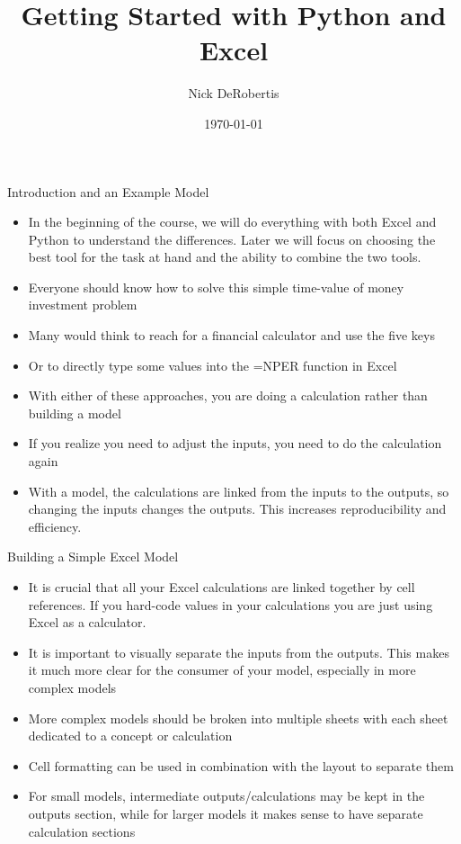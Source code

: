 \documentclass[]{article}
\begin{document}
\title{Getting Started with Python and Excel}
\author{Nick DeRobertis}
\date{\today}
\maketitle
\begin{section}{Introduction and an Example Model}
\begin{itemize}
\item In the beginning of the course, we will do everything with both Excel and Python to understand the differences. Later we will focus on choosing the best tool for the task at hand and the ability to combine the two tools.
\item Everyone should know how to solve this simple time-value of money investment problem
\item Many would think to reach for a financial calculator and use the five keys
\item Or to directly type some values into the =NPER function in Excel
\item With either of these approaches, you are doing a calculation rather than building a model
\item If you realize you need to adjust the inputs, you need to do the calculation again
\item With a model, the calculations are linked from the inputs to the outputs, so changing the inputs changes the outputs. This increases reproducibility and efficiency.
\end{itemize}
\end{section}
\begin{section}{Building a Simple Excel Model}
\begin{itemize}
\item It is crucial that all your Excel calculations are linked together by cell references. If you hard-code values in your calculations you are just using Excel as a calculator.
\item It is important to visually separate the inputs from the outputs. This makes it much more clear for the consumer of your model, especially in more complex models
\item More complex models should be broken into multiple sheets with each sheet dedicated to a concept or calculation
\item Cell formatting can be used in combination with the layout to separate them
\item For small models, intermediate outputs/calculations may be kept in the outputs section, while for larger models it makes sense to have separate calculation sections
\end{itemize}
\end{section}
\end{document}
